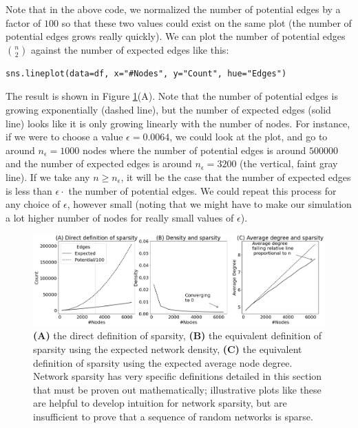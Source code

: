 Note that in the above code, we normalized the number of potential edges by a factor of $100$ so that these two values could exist on the same plot (the number of potential edges grows really quickly). We can plot the number of potential edges $\binom n 2$ against the number of expected edges like this:
\begin{lstlisting}[style=python]
sns.lineplot(data=df, x="#Nodes", y="Count", hue="Edges")
\end{lstlisting}
The result is shown in Figure \ref{fig:ch7:density:sparsity}(A). Note that the number of potential edges is growing exponentially (dashed line), but the number of expected edges (solid line) looks like it is only growing linearly with the number of nodes. For instance, if we were to choose a value $\epsilon = 0.0064$, we could look at the plot, and go to around $n_\epsilon = 1000$ nodes where the number of potential edges is around $500000$ and the number of expected edges is around $n_\epsilon = 3200$ (the vertical, faint gray line). If we take any $n \geq n_{\epsilon}$, it will be the case that the number of expected edges is less than $\epsilon\cdot$ the number of potential edges. We could repeat this process for any choice of $\epsilon$, however small (noting that we might have to make our simulation a lot higher number of nodes for really small values of $\epsilon$).

\begin{figure}
    \centering
    \includegraphics[width=\linewidth]{applications/ch7/Images/sparse_nets.png}
    \caption[Conceptualizing sparse networks]{\textbf{(A)} the direct definition of sparsity, \textbf{(B)} the equivalent definition of sparsity using the expected network density, \textbf{(C)} the equivalent definition of sparsity using the expected average node degree. Network sparsity has very specific definitions detailed in this section that must be proven out mathematically; illustrative plots like these are helpful to develop intuition for network sparsity, but are insufficient to prove that a sequence of random networks is sparse.}
    \label{fig:ch7:density:sparsity}
\end{figure}

